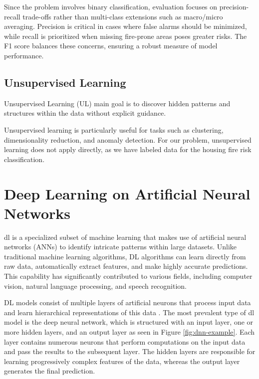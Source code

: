 Since the problem involves binary classification, evaluation focuses on precision-recall 
trade-offs rather than multi-class extensions such as macro/micro averaging. Precision 
is critical in cases where false alarms should be minimized, while recall is prioritized 
when missing fire-prone areas poses greater risks. The F1 score balances these concerns, 
ensuring a robust measure of model performance.


\subsection{Unsupervised Learning}

Unsupervised Learning (UL) main goal is to discover hidden patterns
and structures within the data without explicit guidance.

Unsupervised learning is particularly useful for tasks such as clustering, dimensionality
reduction, and anomaly detection. For our problem, unsupervised learning does not
apply directly, as we have labeled data for the housing fire risk classification.



\section{Deep Learning on Artificial Neural Networks}

\gls{dl} is a specialized subset of machine learning that makes use of
artificial neural networks (ANNs) to identify intricate patterns within large datasets.
Unlike traditional machine learning algorithms, DL algorithms can learn directly
from raw data, automatically extract features, and make highly accurate predictions.
This capability has significantly contributed to various fields, including computer vision,
natural language processing, and speech recognition.

DL models consist of multiple layers of artificial neurons that process
input data and learn hierarchical representations of this data \cite{spotfire_neural_network}. The most prevalent
type of \gls{dl} model is the deep neural network, which is structured with an
input layer, one or more hidden layers, and an output layer as seen in Figure \ref{fig:dnn-example}. Each layer contains
numerous neurons that perform computations on the input data and pass the results
to the subsequent layer. The hidden layers are responsible for learning progressively
complex features of the data, whereas the output layer generates the final prediction.


